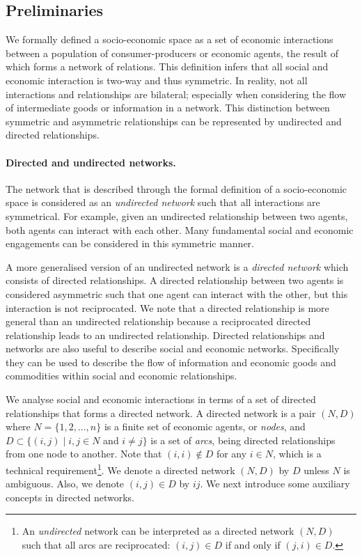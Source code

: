 \documentclass[11pt,fleqn]{article}
\begin{document}
\subsection{Preliminaries}

We formally defined a socio-economic space as a set of economic interactions between a population of consumer-producers or economic agents, the result of which forms a network of relations. This definition infers that all social and economic interaction is two-way and thus symmetric. In reality, not all interactions and relationships are bilateral; especially when considering the flow of intermediate goods or information in a network. This distinction between symmetric and asymmetric relationships can be represented by undirected and directed relationships.

\paragraph{Directed and undirected networks.}

The network that is described through the formal definition of a socio-economic space is considered as an \emph{undirected network} such that all interactions are symmetrical. For example, given an undirected relationship between two agents, both agents can interact with each other. Many fundamental social and economic engagements can be considered in this symmetric manner.

A more generalised version of an undirected network is a \emph{directed network} which consists of directed relationships. A directed relationship between two agents is considered asymmetric such that one agent can interact with the other, but this interaction is not reciprocated. We note that a directed relationship is more general than an undirected relationship because a reciprocated directed relationship leads to an undirected relationship. Directed relationships and networks are also useful to describe social and economic networks. Specifically they can be used to describe the flow of information and economic goods and commodities within social and economic relationships.

We analyse social and economic interactions in terms of a set of directed relationships that forms a directed network. A directed network is a pair $(N,D)$ where $N = \{1,2, \ldots ,n\}$ is a finite set of economic agents, or \emph{nodes}, and $D \subset \{ (i,j) \mid i,j \in N$ and $i \neq j \}$ is a set of \emph{arcs}, being directed relationships from one node to another. Note that $(i,i) \notin D$ for any $i \in N$, which is a technical requirement\footnote{An \emph{undirected} network can be interpreted as a directed network $(N,D)$ such that all arcs are reciprocated: $(i,j) \in D$ if and only if $(j,i) \in D$.}. We denote a directed network $(N,D)$ by $D$ unless $N$ is ambiguous. Also, we denote $(i,j) \in D$ by $ij$. We next introduce some auxiliary concepts in directed networks.
\end{document}
